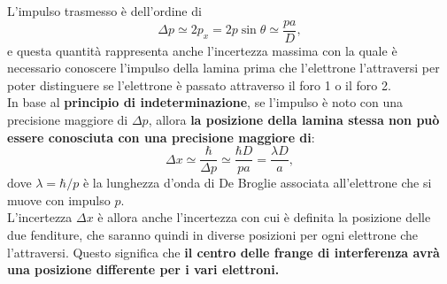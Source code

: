 \documentclass[a4paper,12pt,oneside]{book}
\begin{document}
L'impulso trasmesso è dell'ordine di
	\begin{equation}
		\boxed{
		\Delta p \simeq 2p_x = 2p \sin \theta \simeq \frac{pa}{D},
		}
	\end{equation}
e questa quantità rappresenta anche l'incertezza massima con la quale è necessario conoscere l'impulso della lamina prima che l'elettrone l'attraversi per poter distinguere se l'elettrone è passato attraverso il foro 1 o il foro 2.\\
In base al \textbf{principio di indeterminazione}, se l'impulso è noto con una precisione maggiore di $\Delta  p$, allora \textbf{la posizione della lamina stessa non può essere conosciuta con una precisione maggiore di}:
	\begin{equation}
		\boxed{
		\Delta x \simeq \frac{\hbar}{\Delta p} \simeq \frac{\hbar D}{pa}= \frac{\lambda D}{a},
		}
	\end{equation}
dove $\lambda = \hbar / p$ è la lunghezza d'onda di De Broglie associata all'elettrone che si muove con impulso $p$.\\

L'incertezza $\Delta x$ è allora anche l'incertezza con cui è definita la posizione delle due fenditure, che saranno quindi in diverse posizioni per ogni elettrone che l'attraversi. Questo significa che \textbf{il centro delle frange di interferenza avrà una posizione differente per i vari elettroni.}\\
\end{document}
